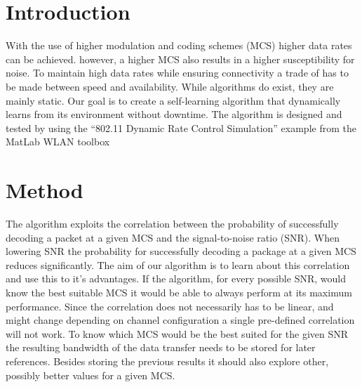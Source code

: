 \documentclass[conference,compsoc]{IEEEtran}
\begin{document}




\maketitle

\begin{abstract}

\end{abstract}


%
\IEEEpeerreviewmaketitle

\section{Introduction} 
With the use of higher modulation and coding schemes (MCS) higher data rates can be achieved. however, a higher MCS also results in a higher susceptibility for noise. To maintain high data rates while ensuring connectivity a trade of has to be made between speed and availability. While algorithms do exist, they are mainly static. Our goal is to create a self-learning algorithm that dynamically learns from its environment without downtime. The algorithm is designed and tested by using the “802.11 Dynamic Rate Control Simulation” example from the MatLab WLAN toolbox  

\section{Method}
The algorithm exploits the correlation between the probability of successfully decoding a packet at a given MCS and the signal-to-noise ratio (SNR). When lowering SNR the probability for successfully decoding a package at a given MCS reduces significantly. The aim of our algorithm is to learn about this correlation and use this to it’s advantages. If the algorithm, for every possible SNR, would know the best suitable MCS it would be able to always perform at its maximum performance. Since the correlation does not necessarily has to be linear, and might change depending on channel configuration a single pre-defined correlation will not work.
To know which MCS would be the best suited for the given SNR the resulting bandwidth of the data transfer needs to be stored for later references. Besides storing the previous results it should also explore other, possibly better values for a given MCS.
\end{document}
